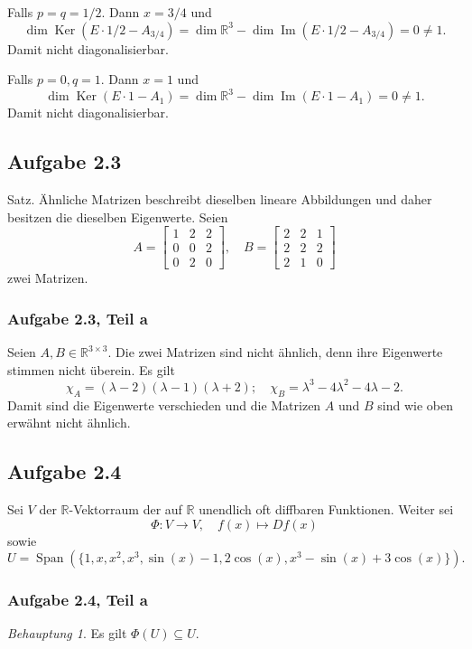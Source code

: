 \documentclass[draft,a5paper]{article}
\theoremstyle{remark}
\newtheorem*{Behauptung}{Behauptung}
\DeclareMathOperator{\Span}{Span}
\DeclareMathOperator{\Ker}{Ker}
\DeclareMathOperator{\Img}{Im}
\begin{document}
Falls \(p = q = 1/2\).  Dann \(x = 3/4\) und
\[\dim \Ker (E \cdot 1/2 - A_{3/4}) = \dim \mathbb{R}^{3} - \dim \Img (E \cdot 1/2 -
  A_{3/4}) = 0 \ne 1.\]  Damit nicht diagonalisierbar.

Falls \(p = 0, q = 1\). Dann \(x = 1\) und
\[\dim \Ker (E \cdot 1 - A_{1}) = \dim \mathbb{R}^{3} - \dim \Img (E \cdot 1 -
  A_{1}) = 0 \ne 1.\] Damit nicht diagonalisierbar.
\subsection{Aufgabe 2.3}
Satz.  Ähnliche Matrizen beschreibt dieselben lineare Abbildungen und
daher besitzen die dieselben Eigenwerte.
Seien
\[A =
  \begin{bmatrix}
    1 & 2 & 2 \\
    0 & 0 & 2 \\
    0 & 2 & 0
  \end{bmatrix},
  \quad
  B =
  \begin{bmatrix}
    2 & 2 & 1 \\
    2 & 2 & 2 \\
    2 & 1 & 0
  \end{bmatrix}
\]
zwei Matrizen.
\subsubsection{Aufgabe 2.3, Teil a}

Seien \(A, B \in \mathbb{R}^{3\times3}\).  Die zwei Matrizen sind nicht ähnlich,
denn ihre Eigenwerte stimmen nicht überein.  Es gilt
\[\chi_{A} = (\lambda-2)(\lambda-1)(\lambda+2); \quad \chi_{B}= \lambda^{3}-4\lambda^{2}-4\lambda-2.\]
Damit sind die Eigenwerte verschieden und die Matrizen \(A\) und \(B\)
sind wie oben erwähnt nicht ähnlich.
\subsection{Aufgabe 2.4}
Sei \(V\) der \(\mathbb{R}\)-Vektorraum der auf \(\mathbb{R}\) unendlich oft diffbaren
Funktionen.  Weiter sei
\[\Phi\colon V \to V, \quad f(x) \mapsto Df(x)\]
sowie
\[U= \Span(\{1, x, x^{2}, x^{3}, \sin(x) - 1, 2\cos(x), x^{3} -
  \sin(x) + 3 \cos(x)\}).\]
\subsubsection{Aufgabe 2.4, Teil a}
\begin{Behauptung}
  Es gilt \(\Phi(U) \subseteq U\).
\end{Behauptung}
\end{document}

